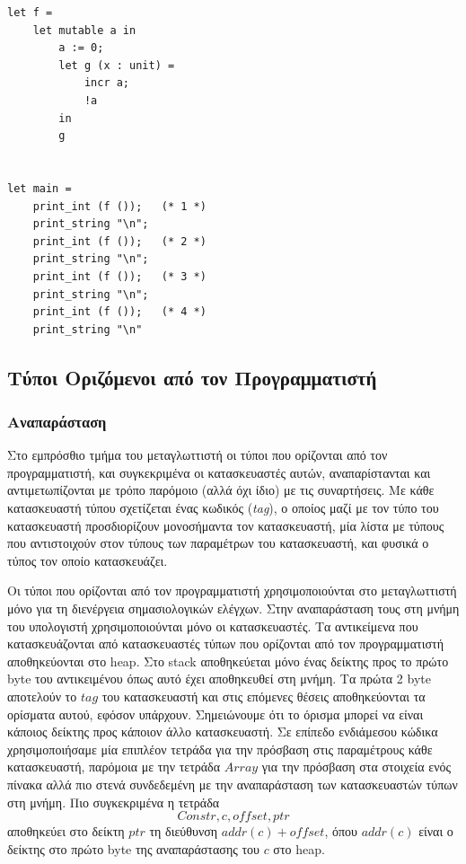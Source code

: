\documentclass[12pt]{article}
\begin{document}
\begin{verbatim}
let f = 
    let mutable a in
        a := 0;
        let g (x : unit) =
            incr a;
            !a
        in
        g


let main = 
    print_int (f ());   (* 1 *)
    print_string "\n";
    print_int (f ());   (* 2 *)
    print_string "\n";
    print_int (f ());   (* 3 *)
    print_string "\n";
    print_int (f ());   (* 4 *)
    print_string "\n"
\end{verbatim}

\subsection{Τύποι Οριζόμενοι από τον Προγραμματιστή}
\subsubsection{Αναπαράσταση}
Στο εμπρόσθιο τμήμα του μεταγλωττιστή οι τύποι που ορίζονται από τον προγραμματιστή, και συγκεκριμένα οι κατασκευαστές αυτών, αναπαρίστανται και αντιμετωπίζονται με τρόπο παρόμοιο (αλλά όχι ίδιο) με τις συναρτήσεις. Με κάθε κατασκευαστή τύπου σχετίζεται ένας κωδικός (\textit{tag}), ο οποίος μαζί με τον τύπο του κατασκευαστή προσδιορίζουν μονοσήμαντα τον κατασκευαστή, μία λίστα με τύπους που αντιστοιχούν στον τύπους των παραμέτρων του κατασκευαστή, και φυσικά ο τύπος τον οποίο κατασκευάζει. 

Οι τύποι που ορίζονται από τον προγραμματιστή χρησιμοποιούνται στο μεταγλωττιστή μόνο για τη διενέργεια σημασιολογικών ελέγχων. Στην αναπαράσταση τους στη μνήμη του υπολογιστή χρησιμοποιούνται μόνο οι κατασκευαστές.
Τα αντικείμενα που κατασκευάζονται από κατασκευαστές τύπων που ορίζονται από τον προγραμματιστή αποθηκεύονται στο heap. Στο stack αποθηκεύεται μόνο ένας δείκτης προς το πρώτο byte του αντικειμένου όπως αυτό έχει αποθηκευθεί στη μνήμη. Τα πρώτα 2 byte αποτελούν το $tag$ του κατασκευαστή και στις επόμενες θέσεις αποθηκεύονται τα ορίσματα αυτού, εφόσον υπάρχουν. Σημειώνουμε ότι το όρισμα μπορεί να είναι κάποιος δείκτης προς κάποιον άλλο κατασκευαστή.
Σε επίπεδο ενδιάμεσου κώδικα χρησιμοποιήσαμε μία επιπλέον τετράδα για την πρόσβαση στις παραμέτρους κάθε κατασκευαστή, παρόμοια με την τετράδα $Array$ για την πρόσβαση στα στοιχεία ενός πίνακα αλλά πιο στενά συνδεδεμένη με την αναπαράσταση των κατασκευαστών τύπων στη μνήμη. Πιο συγκεκριμένα η τετράδα
$$ Constr, c, offset, ptr$$
αποθηκεύει στο δείκτη $ptr$ τη διεύθυνση $addr(c)+offset$, όπου $addr(c)$ είναι ο δείκτης στο πρώτο byte της αναπαράστασης του $c$ στο heap.
\end{document}
